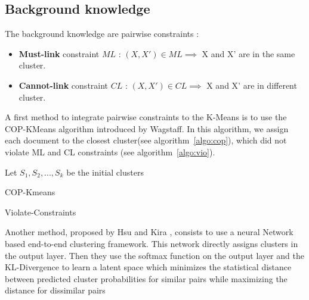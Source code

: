 \subsection{Background knowledge}
The background knowledge are pairwise constraints :
\begin{itemize}
\item \textbf{Must-link} constraint $ML$ : $(X, X') \in ML \implies $ X and X' are in the
  same cluster.
\item \textbf{Cannot-link} constraint $CL$ : $(X, X') \in CL \implies $ X and X' are in
  different cluster.
\end{itemize}
A first method to integrate pairwise constraints to the K-Means is to use the 
COP-KMeans algorithm introduced by Wagstaff\cite{Wagstaff:2001:CKC:645530.655669}.
In this algorithm, we assign each document to the closest cluster(see algorithm~\ref{algo:cop}), 
which did not violate ML and CL constraints (see algorithm~\ref{algo:vio}).
\begin{algorithm}[!h]
  Let $S_1, S_2 , ..., S_k$ be the initial clusters\\
  \caption{\label{algo:cop}COP-Kmeans}
\end{algorithm}
\begin{algorithm}[!h]
  \caption{\label{algo:vio}Violate-Constraints}
\end{algorithm}
Another method, proposed by Hsu and Kira \cite{2015arXiv151106321H}, consists to 
use a neural Network based end-to-end clustering framework. This network 
directly assigns clusters in the output layer. Then they use the softmax 
function on the output layer and the KL-Divergence to learn a latent space 
which minimizes the statistical distance between predicted cluster probabilities 
for similar pairs while maximizing the distance for dissimilar pairs

